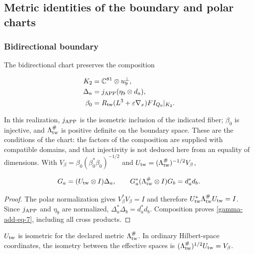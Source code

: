 \subsection{Metric identities of the boundary and polar charts}
\label{gamma-add-sub-195}

\subsubsection{Bidirectional boundary}
\label{gamma-add-sub-197}

The bidirectional chart preserves the composition

\begin{equation}
\begin{aligned}
K_2&=\mathbb C^{81}\otimes u_9^\perp,\\
\Delta_a&=j_{\rm APP}(\eta_9\otimes d_a),\\
\beta_0&=R_{\rm tw}(L^3+\varepsilon\nabla_x)FI_{Q_9}|_{K_2}.
\end{aligned}
\label{gamma-add-display-16}
\end{equation}

In this realization, \(j_{\rm APP}\) is the isometric inclusion
of the indicated fiber; \(\beta_0\) is injective, and
\(\Lambda_{\rm tw}^{\#}\) is positive definite on the boundary
space. These are the conditions of the chart: the factors of the
composition are supplied with compatible domains, and that
injectivity is not deduced here from an equality of dimensions.
With \(V_\beta=\beta_0(\beta_0^*\beta_0)^{-1/2}\) and
\(U_{\rm tw}=(\Lambda_{\rm tw}^{\#})^{-1/2}V_\beta\),

\begin{equation}
G_a=(U_{\rm tw}\otimes I)\Delta_a,\qquad
G_a^*(\Lambda_{\rm tw}^{\#}\otimes I)G_b=d_a^*d_b.
\label{gamma-add-eq-7}
\end{equation}

\begin{proof}
The polar normalization gives \(V_\beta^*V_\beta=I\) and therefore
\(U_{\rm tw}^*\Lambda_{\rm tw}^{\#}U_{\rm tw}=I\).
Since \(j_{\rm APP}\) and \(\eta_9\) are normalized,
\(\Delta_a^*\Delta_b=d_a^*d_b\). Composition proves
\eqref{gamma-add-eq-7}, including all cross products.
\end{proof}
\(U_{\rm tw}\) is isometric for the declared metric
\(\Lambda_{\rm tw}^{\#}\). In ordinary Hilbert-space coordinates,
the isometry between the effective spaces is
\((\Lambda_{\rm tw}^{\#})^{1/2}U_{\rm tw}=V_\beta\).

